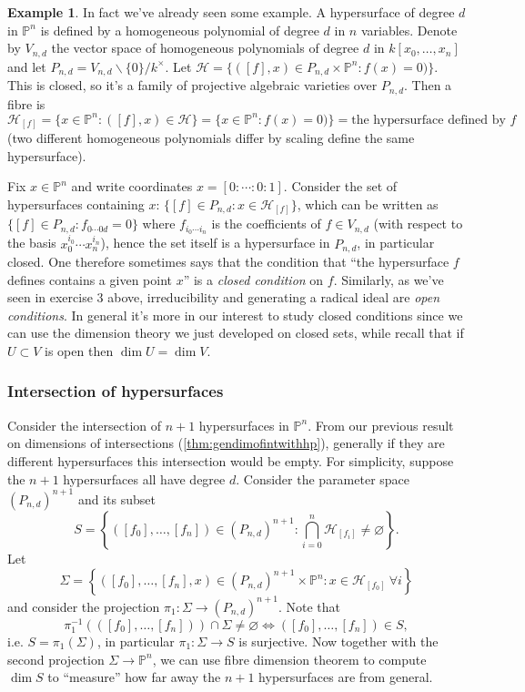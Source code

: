 \documentclass{article}
\newcommand{\p}{\mathbb{P}}
\theoremstyle{definition}
\newtheorem{example}[defn]{Example}
\begin{document}
\begin{example}
In fact we've already seen some example. A hypersurface of degree $d$ in $\p^n$ is defined by a homogeneous polynomial of degree $d$ in $n$ variables. Denote by $V_{n,d}$ the vector space of homogeneous polynomials of degree $d$ in $k[x_0,\ldots,x_n]$ and let $P_{n,d}=V_{n,d}\backslash\{0\}/k^\times$. Let $\mathcal H=\{([f],x)\in P_{n,d}\times\p^n:f(x)=0)\}$. This is closed, so it's a family of projective algebraic varieties over $P_{n,d}$. Then a fibre is
\[
\mathcal H_{[f]}=\{x\in\p^n:([f],x)\in\mathcal H\}=\{x\in\p^n:f(x)=0)\}=\text{the hypersurface defined by }f
\]
(two different homogeneous polynomials differ by scaling define the same hypersurface).

Fix $x\in\p^n$ and write coordinates $x=[0:\cdots:0:1]$. Consider the set of hypersurfaces containing $x$: $\{[f]\in P_{n,d}:x\in\mathcal H_{[f]}\}$, which can be written as $\{[f]\in P_{n,d}:f_{0\cdots 0d}=0\}$ where $f_{i_0\cdots i_n}$ is the coefficients of $f\in V_{n,d}$ (with respect to the basis $x_0^{i_0}\cdots x_n^{i_n}$), hence the set itself is a hypersurface in $P_{n,d}$, in particular closed. One therefore sometimes says that the condition that ``the hypersurface $f$ defines contains a given point $x$'' is a \textit{closed condition} on $f$. Similarly, as we've seen in exercise 3 above, irreducibility and generating a radical ideal are \textit{open conditions}. In general it's more in our interest to study closed conditions since we can use the dimension theory we just developed on closed sets, while recall that if $U\subset V$ is open then $\dim U=\dim V$.

\subsubsection{Intersection of hypersurfaces}
Consider the intersection of $n+1$ hypersurfaces in $\p^n$. From our previous result on dimensions of intersections (\ref{thm:gendimofintwithhp}), generally if they are different hypersurfaces this intersection would be empty. For simplicity, suppose the $n+1$ hypersurfaces all have degree $d$. Consider the parameter space $(P_{n,d})^{n+1}$ and its subset
\[
S=\left\{([f_0],\ldots,[f_n])\in(P_{n,d})^{n+1}:\bigcap_{i=0}^n\mathcal H_{[f_i]}\neq\varnothing\right\}.
\]
Let
\[
\Sigma=\left\{([f_0],\ldots,[f_n],x)\in (P_{n,d})^{n+1}\times\p^n:x\in\mathcal H_{[f_0]} \ \forall i\right\}
\]
and consider the projection $\pi_1:\Sigma\rightarrow(P_{n,d})^{n+1}$. Note that
\[
\pi_1^{-1}(([f_0],\ldots,[f_n]))\cap\Sigma\neq\varnothing \iff ([f_0],\ldots,[f_n])\in S,
\]
i.e. $S=\pi_1(\Sigma)$, in particular $\pi_1:\Sigma\rightarrow S$ is surjective. Now together with the second projection $\Sigma\rightarrow\p^n$, we can use fibre dimension theorem to compute $\dim S$ to ``measure'' how far away the $n+1$ hypersurfaces are from general.
\end{example}
\end{document}
